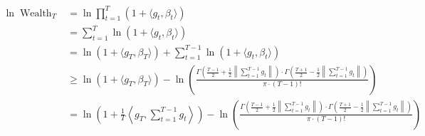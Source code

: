 \documentclass{article}
\DeclareMathOperator{\Wealth}{Wealth}
\begin{document}
\begin{align*}
\ln \Wealth_T
& = \ln \prod_{t=1}^T (1 + \langle g_t, \beta_t \rangle) \\
& =  \sum_{t=1}^T \ln (1 + \langle g_t, \beta_t \rangle) \\
& =  \ln (1 + \langle g_T, \beta_T \rangle) + \sum_{t=1}^{T-1} \ln (1 + \langle g_t, \beta_t \rangle) \\
& \ge \ln (1 + \langle g_T, \beta_T \rangle)
- \ln\left( \frac{\Gamma \left(\frac{T-1}{2} + \frac{1}{2}\left\|\sum_{t=1}^{T-1} g_t \right\| \right) \cdot \Gamma \left(\frac{T+1}{2} - \frac{1}{2} \left\|\sum_{t=1}^{T-1} g_t \right\| \right)}{\pi \cdot (T-1)!} \right) \\
& = \ln \left(1 + \frac{1}{T} \left\langle g_T, \sum_{t=1}^{T-1} g_t \right\rangle \right)
- \ln\left( \frac{\Gamma \left(\frac{T-1}{2} + \frac{1}{2}\left\|\sum_{t=1}^{T-1} g_t \right\| \right) \cdot \Gamma \left(\frac{T+1}{2} - \frac{1}{2} \left\|\sum_{t=1}^{T-1} g_t \right\| \right)}{\pi \cdot (T-1)!} \right) \\
\end{align*}
\end{document}
